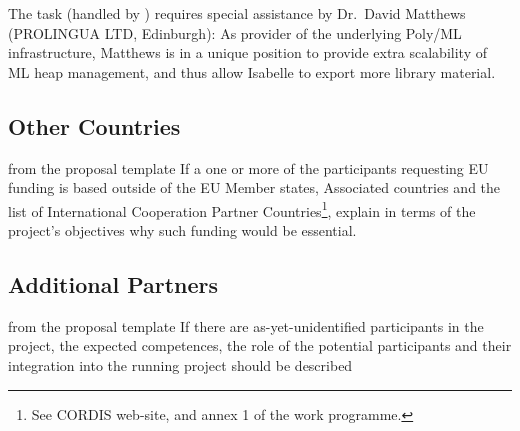The task  (handled by )
requires special assistance by Dr.\ David Matthews (PROLINGUA LTD,
Edinburgh): As provider of the underlying Poly/ML infrastructure,
Matthews is in a unique position to provide extra scalability of ML
heap management, and thus allow Isabelle to export more library
material.


\subsection{Other Countries}\label{sec:other-countries}
\begin{todo}{from the proposal template}
  If a one or more of the participants requesting EU funding is based outside of the EU
  Member states, Associated countries and the list of International Cooperation Partner
  Countries\footnote{See CORDIS web-site, and annex 1 of the work programme.}, explain in
  terms of the project’s objectives why such funding would be essential.
\end{todo}

\subsection{Additional Partners}\label{sec:assoc-partner}
\begin{todo}{from the proposal template}
  If there are as-yet-unidentified participants in the project, the expected competences,
  the role of the potential participants and their integration into the running project
  should be described
\end{todo}

